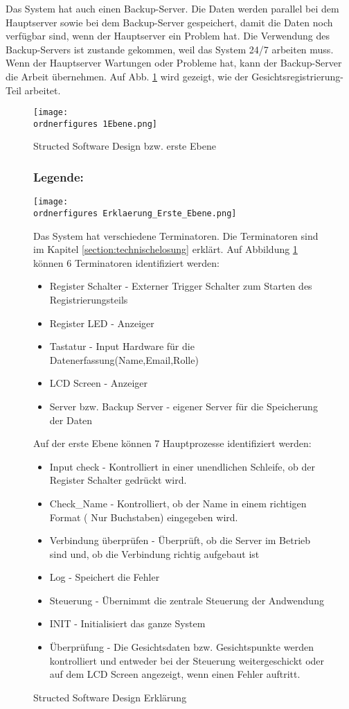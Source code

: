 Das System hat auch einen Backup-Server. Die Daten werden parallel bei dem Hauptserver sowie bei dem Backup-Server gespeichert, damit die Daten noch verf\"ugbar sind, wenn der Hauptserver ein Problem hat. Die Verwendung des Backup-Servers ist zustande gekommen, weil das System 24/7 arbeiten muss. Wenn der Hauptserver Wartungen oder Probleme hat, kann der Backup-Server die Arbeit \"ubernehmen. Auf Abb. \ref{fig:1Ebene_Gesichtsregistrierung} wird gezeigt, wie der Gesichtsregistrierung-Teil arbeitet.

\begin{figure}[H]
	
		\texttt{[image: \\ordnerfigures 1Ebene.png]}
		\caption{Structed Software Design bzw. erste Ebene } 
		\subsubsection{Legende:}
		\texttt{[image: \\ordnerfigures Erklaerung\_Erste\_Ebene.png]}
		\caption{Structed Software Design Erklärung}
	Das System hat verschiedene Terminatoren. Die Terminatoren sind im Kapitel  \ref{section:technischelosung} erkl\"art. 
	Auf Abbildung \ref{fig:1Ebene_Gesichtsregistrierung} k\"onnen 6 Terminatoren identifiziert werden:
	\begin{itemize}
	\item Register Schalter - Externer Trigger Schalter zum Starten des Registrierungsteils 
	\item Register LED - Anzeiger 
	\item Tastatur - Input Hardware f\"ur die Datenerfassung(Name,Email,Rolle) 
	\item LCD Screen - Anzeiger 
	\item Server bzw. Backup Server - eigener Server f\"ur die Speicherung der Daten 
	\end{itemize}
	\newpage
	Auf der erste Ebene k\"onnen 7 Hauptprozesse identifiziert werden:
	\begin{itemize}
	\item Input check - Kontrolliert in einer unendlichen Schleife, ob der Register Schalter gedr\"uckt wird.
	\item Check\_Name - Kontrolliert, ob der Name in einem richtigen Format ( Nur Buchstaben) eingegeben wird. 
	\item Verbindung \"uberpr\"ufen - \"Uberpr\"uft, ob die Server im Betrieb sind und, ob die Verbindung richtig aufgebaut ist
	\item Log - Speichert die Fehler
	\item Steuerung - \"Ubernimmt die zentrale Steuerung der Andwendung
	\item INIT - Initialisiert das ganze System
	\item \"Uberpr\"ufung - Die Gesichtsdaten bzw. Gesichtspunkte werden kontrolliert und entweder bei der Steuerung weitergeschickt oder auf dem LCD Screen angezeigt, wenn einen Fehler auftritt.
	\end{itemize}
	\label{fig:1Ebene_Gesichtsregistrierung}
\end{figure}
